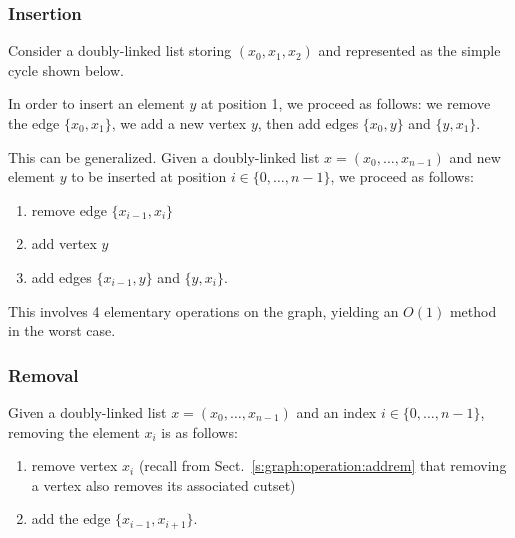 \documentclass[a4paper]{book}
\theoremstyle{changebreak}                %
\begin{document}
\subsubsection{Insertion}
Consider a doubly-linked list storing $(x_0,x_1,x_2)$ and represented
as the simple cycle shown below.
\begin{center}
\end{center}
In order to insert an element $y$ at position 1, we proceed as
follows: we remove the edge $\{x_0,x_1\}$, we add
a new vertex $y$, then add
edges $\{x_0,y\}$ and $\{y,x_1\}$.
\begin{center}
\end{center}

This can be generalized. Given a doubly-linked list
$x=(x_0,\ldots,x_{n-1})$ and new element $y$ to be inserted at
position $i\in\{0,\ldots,n-1\}$, we proceed as follows:
\begin{enumerate}
\item remove edge $\{x_{i-1},x_i\}$
\item add vertex $y$
\item add edges $\{x_{i-1},y\}$ and $\{y,x_i\}$.
\end{enumerate}
This involves 4 elementary operations on the
graph, yielding an $O(1)$ method in the worst
case.

\subsubsection{Removal}
Given a doubly-linked list $x=(x_0,\ldots,x_{n-1})$ and an index
$i\in\{0,\ldots,n-1\}$, removing the element $x_i$
is as follows:
\begin{enumerate}
\item remove vertex $x_i$ (recall from
  Sect.~\ref{s:graph:operation:addrem} that removing a
  vertex also removes its associated
  cutset)
\item add the edge $\{x_{i-1},x_{i+1}\}$.
\end{enumerate}
\end{document}
